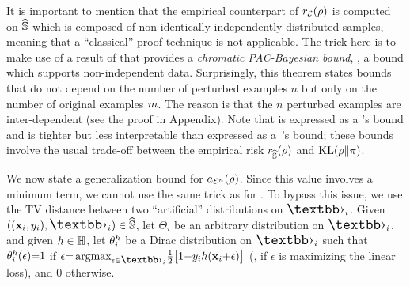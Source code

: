 It is important to mention that the empirical counterpart of $r_{{\mathcal{E}}}(\rho)$ is computed on $\widehat{\mathbb{S}}$ which is composed of non identically independently distributed samples, meaning that a ``classical'' proof technique is not applicable.
The trick here is to make use of a result of \citet{RalaivolaSzafranskiStempfel2010} that provides a {\it chromatic PAC-Bayesian bound}, \ie, a bound which supports non-independent data. 
Surprisingly, this theorem states bounds that do not depend on the number of perturbed examples $n$ but only on the number of original examples $m$.
The reason is that the $n$ perturbed examples are  inter-dependent (see the proof in Appendix).
Note that  is expressed as a \citet{Seeger2002}'s bound and is tighter but less interpretable than  expressed as a~\citet{McAllester1998}'s bound; these bounds involve the usual trade-off between the empirical risk $r_{\widehat{\mathbb{S}}}(\rho)$ and $\operatorname{KL}(\rho\|\pi)$.

We now state a generalization bound for $a_{{\mathcal{E}}^{n}}(\rho)$.
Since this value involves a minimum term, we cannot use the same trick as for . 
To bypass this issue, we use the TV distance between two ``artificial'' distributions on $\Epert_i$.
Given $((\x_i,\y_i),\Epert_i)\in\Spert$, let $\Theta_i$ be an arbitrary distribution on $\Epert_i$, and given $h\in\mathbb{H}$, let $\theta_i^{h}$ be a Dirac distribution on $\Epert_i$ such that $\theta_i^h(\epsilon){=}1$ if $\epsilon{=} \argmax_{\epsilon\in\Epert_i}\!\frac{1}{2}\big[1{-}\y_i\h(\x_i{+}\epsilon)\big]$ (\ie, if $\epsilon$ is maximizing the linear loss), and $0$ otherwise.

